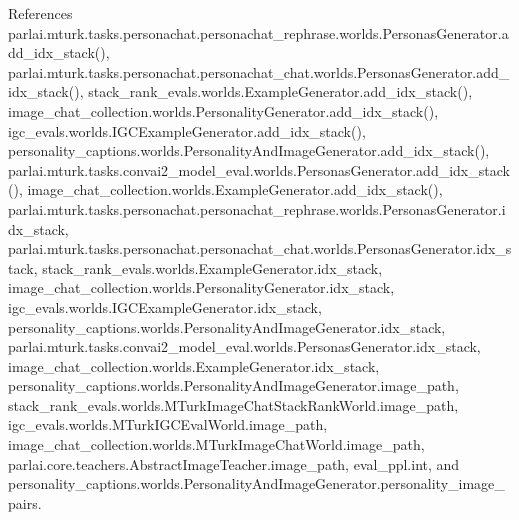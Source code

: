 References parlai.\+mturk.\+tasks.\+personachat.\+personachat\+\_\+rephrase.\+worlds.\+Personas\+Generator.\+add\+\_\+idx\+\_\+stack(), parlai.\+mturk.\+tasks.\+personachat.\+personachat\+\_\+chat.\+worlds.\+Personas\+Generator.\+add\+\_\+idx\+\_\+stack(), stack\+\_\+rank\+\_\+evals.\+worlds.\+Example\+Generator.\+add\+\_\+idx\+\_\+stack(), image\+\_\+chat\+\_\+collection.\+worlds.\+Personality\+Generator.\+add\+\_\+idx\+\_\+stack(), igc\+\_\+evals.\+worlds.\+I\+G\+C\+Example\+Generator.\+add\+\_\+idx\+\_\+stack(), personality\+\_\+captions.\+worlds.\+Personality\+And\+Image\+Generator.\+add\+\_\+idx\+\_\+stack(), parlai.\+mturk.\+tasks.\+convai2\+\_\+model\+\_\+eval.\+worlds.\+Personas\+Generator.\+add\+\_\+idx\+\_\+stack(), image\+\_\+chat\+\_\+collection.\+worlds.\+Example\+Generator.\+add\+\_\+idx\+\_\+stack(), parlai.\+mturk.\+tasks.\+personachat.\+personachat\+\_\+rephrase.\+worlds.\+Personas\+Generator.\+idx\+\_\+stack, parlai.\+mturk.\+tasks.\+personachat.\+personachat\+\_\+chat.\+worlds.\+Personas\+Generator.\+idx\+\_\+stack, stack\+\_\+rank\+\_\+evals.\+worlds.\+Example\+Generator.\+idx\+\_\+stack, image\+\_\+chat\+\_\+collection.\+worlds.\+Personality\+Generator.\+idx\+\_\+stack, igc\+\_\+evals.\+worlds.\+I\+G\+C\+Example\+Generator.\+idx\+\_\+stack, personality\+\_\+captions.\+worlds.\+Personality\+And\+Image\+Generator.\+idx\+\_\+stack, parlai.\+mturk.\+tasks.\+convai2\+\_\+model\+\_\+eval.\+worlds.\+Personas\+Generator.\+idx\+\_\+stack, image\+\_\+chat\+\_\+collection.\+worlds.\+Example\+Generator.\+idx\+\_\+stack, personality\+\_\+captions.\+worlds.\+Personality\+And\+Image\+Generator.\+image\+\_\+path, stack\+\_\+rank\+\_\+evals.\+worlds.\+M\+Turk\+Image\+Chat\+Stack\+Rank\+World.\+image\+\_\+path, igc\+\_\+evals.\+worlds.\+M\+Turk\+I\+G\+C\+Eval\+World.\+image\+\_\+path, image\+\_\+chat\+\_\+collection.\+worlds.\+M\+Turk\+Image\+Chat\+World.\+image\+\_\+path, parlai.\+core.\+teachers.\+Abstract\+Image\+Teacher.\+image\+\_\+path, eval\+\_\+ppl.\+int, and personality\+\_\+captions.\+worlds.\+Personality\+And\+Image\+Generator.\+personality\+\_\+image\+\_\+pairs.

